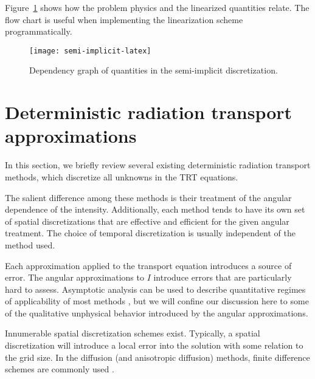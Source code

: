 Figure~\ref{fig:semiImplicitFlowchart} shows how the problem physics and the
linearized quantities relate. The flow chart is useful when
implementing the linearization scheme programmatically. 

\begin{figure}[htbp]
  \centering
  \texttt{[image: semi-implicit-latex]}
  \caption{Dependency graph of quantities in the semi-implicit discretization.}
  \label{fig:semiImplicitFlowchart}
\end{figure}

\section{Deterministic radiation transport approximations}
\label{sec:bgApproxMethods}

In this section, we briefly review several existing deterministic radiation
transport methods, which discretize all unknowns in the TRT equations.

The salient difference among these methods is their treatment of
the angular dependence of the intensity. Additionally, each method tends to have
its own set of spatial discretizations that are effective and efficient for the
given angular treatment. The choice of temporal discretization is usually
independent of the method used.

Each approximation applied to the transport
equation introduces a source of error. The angular approximations to $I$
introduce errors that are particularly hard to assess. Asymptotic
analysis can be used to describe quantitative regimes of applicability of most
methods \cite{Lar1983a,Ada1998a,Mor2000}, but we will confine our discussion
here to some of the qualitative
unphysical behavior introduced by the angular approximations.

Innumerable spatial discretization schemes exist. Typically, a
spatial discretization will introduce a local error into the solution with some
relation to the grid size. In the diffusion (and anisotropic diffusion) methods,
finite difference schemes are commonly used \cite{Lev2007}.

